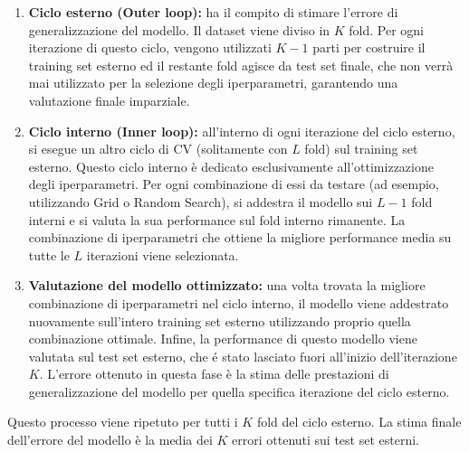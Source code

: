 \documentclass[a4paper,12pt]{report}
\begin{document}
	\begin{enumerate}
		\item \textbf{Ciclo esterno (Outer loop):} ha il compito di stimare l'errore di generalizzazione del modello. Il dataset viene diviso in $K$ fold. Per ogni iterazione di questo ciclo, vengono utilizzati $K-1$ parti per costruire il training set esterno ed il restante fold agisce da test set finale, che non verrà mai utilizzato per la selezione degli iperparametri, garantendo una valutazione finale imparziale.
		\item \textbf{Ciclo interno (Inner loop):} all'interno di ogni iterazione del ciclo esterno, si esegue un altro ciclo di CV (solitamente con $L$ fold) sul training set esterno. Questo ciclo interno è dedicato esclusivamente all'ottimizzazione degli iperparametri. Per ogni combinazione di essi da testare (ad esempio, utilizzando Grid o Random Search), si addestra il modello sui $L-1$ fold interni e si valuta la sua performance sul fold interno rimanente. La combinazione di iperparametri che ottiene la migliore performance media su tutte le $L$ iterazioni viene selezionata.
		\item \textbf{Valutazione del modello ottimizzato:} una volta trovata la migliore combinazione di iperparametri nel ciclo interno, il modello viene addestrato nuovamente sull'intero training set esterno utilizzando proprio quella combinazione ottimale. Infine, la performance di questo modello viene valutata sul test set esterno, che é stato lasciato fuori all'inizio dell'iterazione $K$. L'errore ottenuto in questa fase è la stima delle prestazioni di generalizzazione del modello per quella specifica iterazione del ciclo esterno.
	\end{enumerate}
	Questo processo viene ripetuto per tutti i $K$ fold del ciclo esterno. La stima finale dell'errore del modello è la media dei $K$ errori ottenuti sui test set esterni.
	
\end{document}
